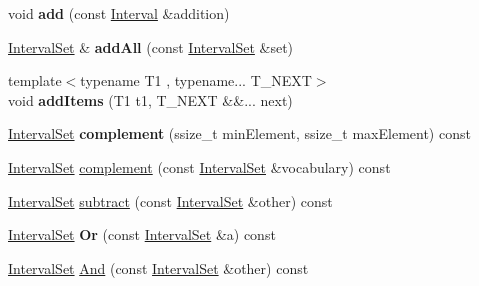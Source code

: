 \begin{DoxyCompactItemize}
\item 
\mbox{\label{classantlr4_1_1misc_1_1IntervalSet_a7d503743162defae29f96405b55f2a27}} 
void {\bfseries add} (const \hyperlink{classantlr4_1_1misc_1_1Interval}{Interval} \&addition)
\item 
\mbox{\label{classantlr4_1_1misc_1_1IntervalSet_a892464253b5fcf743091ba4a94dc4622}} 
\hyperlink{classantlr4_1_1misc_1_1IntervalSet}{Interval\+Set} \& {\bfseries add\+All} (const \hyperlink{classantlr4_1_1misc_1_1IntervalSet}{Interval\+Set} \&set)
\item 
\mbox{\label{classantlr4_1_1misc_1_1IntervalSet_a2c01dec9ec1f6bc4f63aa3246a38103a}} 
{\footnotesize template$<$typename T1 , typename... T\+\_\+\+N\+E\+XT$>$ }\\void {\bfseries add\+Items} (T1 t1, T\+\_\+\+N\+E\+XT \&\&... next)
\item 
\mbox{\label{classantlr4_1_1misc_1_1IntervalSet_a48ee1cc2b279df1c451e99328370d274}} 
\hyperlink{classantlr4_1_1misc_1_1IntervalSet}{Interval\+Set} {\bfseries complement} (ssize\+\_\+t min\+Element, ssize\+\_\+t max\+Element) const
\item 
\hyperlink{classantlr4_1_1misc_1_1IntervalSet}{Interval\+Set} \hyperlink{classantlr4_1_1misc_1_1IntervalSet_a8abb367611d1797657ae64247403f4e2}{complement} (const \hyperlink{classantlr4_1_1misc_1_1IntervalSet}{Interval\+Set} \&vocabulary) const
\item 
\hyperlink{classantlr4_1_1misc_1_1IntervalSet}{Interval\+Set} \hyperlink{classantlr4_1_1misc_1_1IntervalSet_ab21b25a3093c1b6173141a89319589fa}{subtract} (const \hyperlink{classantlr4_1_1misc_1_1IntervalSet}{Interval\+Set} \&other) const
\item 
\mbox{\label{classantlr4_1_1misc_1_1IntervalSet_a5b29c1a77e98907618e1820ff185362d}} 
\hyperlink{classantlr4_1_1misc_1_1IntervalSet}{Interval\+Set} {\bfseries Or} (const \hyperlink{classantlr4_1_1misc_1_1IntervalSet}{Interval\+Set} \&a) const
\item 
\hyperlink{classantlr4_1_1misc_1_1IntervalSet}{Interval\+Set} \hyperlink{classantlr4_1_1misc_1_1IntervalSet_a181657a8554e9836bd2dc7c9be0a02f0}{And} (const \hyperlink{classantlr4_1_1misc_1_1IntervalSet}{Interval\+Set} \&other) const

\end{DoxyCompactItemize}
